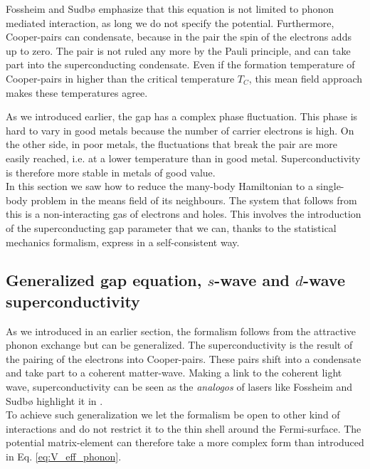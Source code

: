 \documentclass[../main.tex]{subfile}
\begin{document}
Fossheim and Sudbø \cite{FossheimSudbo2004} emphasize that this equation is not limited to phonon mediated interaction, as long we
do not specify the potential. Furthermore, Cooper-pairs can condensate, because in the pair the spin of the electrons adds up to zero.
The pair is not ruled any more by the Pauli principle, and can take part into the superconducting condensate.
Even if the formation temperature of Cooper-pairs in higher than the critical temperature $T_C$, this mean field approach makes these temperatures agree.

As we introduced earlier, the gap has a complex phase fluctuation. This phase is hard to vary in good metals because the number of carrier electrons is high.
On the other side, in poor metals, the fluctuations that break the pair are more easily reached, i.e. at a lower temperature than in good metal. Superconductivity
is therefore more stable in metals of good value.\\

In this section we saw how to reduce the many-body Hamiltonian to a single-body problem in the means field of its neighbours. The system that follows from this
is a non-interacting gas of electrons and holes. This involves the introduction of the 
superconducting gap parameter that we can, thanks to the statistical mechanics formalism, express in a self-consistent way.


\subsection{Generalized gap equation, $s$-wave and $d$-wave superconductivity}
As we introduced in an earlier section, the formalism follows from the attractive phonon exchange but can be generalized. The superconductivity
is the result of the pairing of the electrons into Cooper-pairs. These pairs shift into a condensate and take part to a coherent matter-wave.
Making a link to the coherent light wave, superconductivity can be seen as the \textit{analogos} of lasers like Fossheim and Sudbø 
highlight it in \cite{FossheimSudbo2004}.\\

To achieve such generalization we let the formalism be open to other kind of interactions and do not restrict it to the thin shell around the Fermi-surface.
The potential matrix-element can therefore take a more complex form than introduced in Eq. \ref{eq:V_eff_phonon}.
\end{document}
